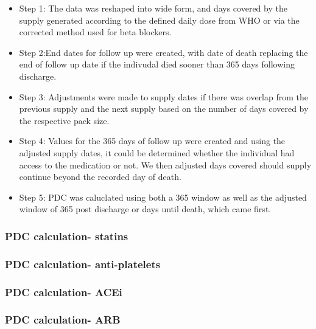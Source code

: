\documentclass[11pt]{article}
\begin{document}
\begin{itemize}
\item Step 1: The data was reshaped into wide form, and days covered by the supply generated according to the defined daily dose from WHO or via the corrected method used for beta blockers.
\item Step 2:End dates for follow up were created, with date of death replacing the end of follow up date if the indivudal died sooner than 365 days following discharge. 
\item Step 3: Adjustments were made to supply dates if there was overlap from the previous supply and the next supply based on the number of days covered by the respective pack size.  
\item Step 4: Values for the 365 days of follow up were created and using the adjusted supply dates, it could be determined whether the individual had access to the medication or not. We then adjusted days covered should supply continue beyond the recorded day of death. 
\item Step 5: PDC was caluclated using both a 365 window as well as the adjusted window of 365 post discharge or days until death, which came first. 

\end{itemize}

\subsubsection{PDC calculation- statins}

\color{violet}
\begin{stlog}\end{stlog}
\color{black}
\subsubsection{PDC calculation- anti-platelets}
\color{violet}
\begin{stlog}\end{stlog}
\color{black}
\subsubsection{PDC calculation- ACEi}
\color{violet}
\begin{stlog}\end{stlog}
\color{black}
\subsubsection{PDC calculation- ARB}
\color{violet}
\begin{stlog}\end{stlog}
\color{black}
\end{document}
